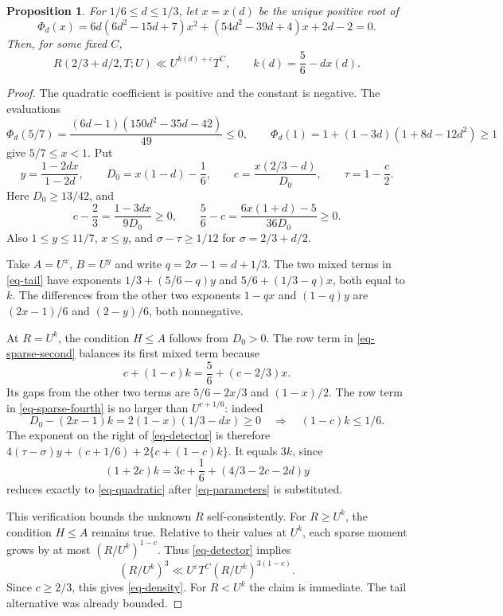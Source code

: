 \documentclass[11pt,a4paper]{article}
\numberwithin{equation}{section}
\newtheorem{proposition}[theorem]{Proposition}
\theoremstyle{remark}
\newcommand{\eps}{\varepsilon}
\begin{document}
\begin{proposition}\label{prop-density}
For $1/6\le d\le1/3$, let $x=x(d)$ be the unique positive root of
\begin{equation}\label{eq-quadratic}
 \Phi_d(x)=6d(6d^2-15d+7)x^2+(54d^2-39d+4)x+2d-2=0.
\end{equation}
Then, for some fixed $C$,
\begin{equation}\label{eq-density}
 R(2/3+d/2,T;U)\ll U^{k(d)+\eps}T^C,
 \qquad k(d)=\frac56-dx(d).
\end{equation}
\end{proposition}

\begin{proof}
The quadratic coefficient is positive and the constant is
negative.  The evaluations
\[
 \Phi_d(5/7)=\frac{(6d-1)(150d^2-35d-42)}{49}\le0,
 \qquad \Phi_d(1)=1+(1-3d)(1+8d-12d^2)\ge1
\]
give $5/7\le x<1$.  Put
\begin{equation}\label{eq-parameters}
 y=\frac{1-2dx}{1-2d},\qquad
 D_0=x(1-d)-\frac16,\qquad
 c=\frac{x(2/3-d)}{D_0},\qquad \tau=1-\frac c2.
\end{equation}
Here $D_0\ge13/42$, and
\[
 c-\frac23=\frac{1-3dx}{9D_0}\ge0,
 \qquad \frac56-c=\frac{6x(1+d)-5}{36D_0}\ge0.
\]
Also $1\le y\le11/7$, $x\le y$, and
$\sigma-\tau\ge1/12$ for $\sigma=2/3+d/2$.

Take $A=U^x$, $B=U^y$ and write $q=2\sigma-1=d+1/3$.
The two mixed terms in \eqref{eq-tail} have exponents
$1/3+(5/6-q)y$ and $5/6+(1/3-q)x$, both equal to $k$.
The differences from the other two exponents $1-qx$ and
$(1-q)y$ are $(2x-1)/6$ and $(2-y)/6$, both nonnegative.

At $R=U^k$, the condition $H\le A$ follows from $D_0>0$.
The row term in \eqref{eq-sparse-second} balances its first
mixed term because
\begin{equation}\label{eq-row-balance}
 c+(1-c)k=\frac56+(c-2/3)x.
\end{equation}
Its gaps from the other two terms are $5/6-2x/3$ and
$(1-x)/2$.  The row term in \eqref{eq-sparse-fourth} is no
larger than $U^{c+1/6}$: indeed
\[
 D_0-(2x-1)k=2(1-x)(1/3-dx)\ge0
 \quad\Longrightarrow\quad (1-c)k\le1/6.
\]
The exponent on the right of \eqref{eq-detector} is therefore
$4(\tau-\sigma)y+(c+1/6)+2\{c+(1-c)k\}$.
It equals $3k$, since
\begin{equation}\label{eq-final-balance}
 (1+2c)k=3c+\frac16+(4/3-2c-2d)y
\end{equation}
reduces exactly to \eqref{eq-quadratic} after \eqref{eq-parameters}
is substituted.

This verification bounds the unknown $R$ self-consistently.
For $R\ge U^k$, the condition $H\le A$ remains true.  Relative
to their values at $U^k$, each sparse moment grows by at most
$(R/U^k)^{1-c}$.  Thus \eqref{eq-detector} implies
\[
 (R/U^k)^3\ll U^\eps T^C(R/U^k)^{3(1-c)}.
\]
Since $c\ge2/3$, this gives \eqref{eq-density}.  For $R<U^k$
the claim is immediate.  The tail alternative was already bounded.
\end{proof}
\end{document}
